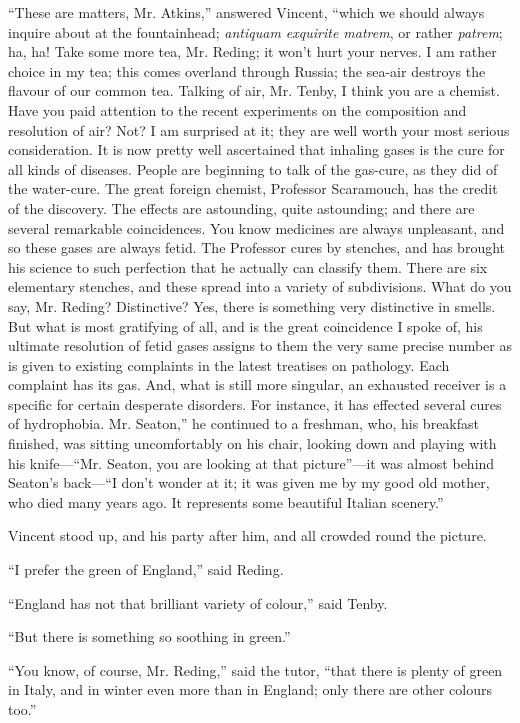 ``These are matters, Mr. Atkins,'' answered Vincent,
``which we should always inquire about at the fountainhead; \emph{antiquam
exquirite matrem}, or rather \emph{patrem}; ha, ha! Take some more
tea, Mr. Reding; it won't hurt your nerves. I am rather choice in my
tea; this comes overland through Russia; the sea-air destroys the
flavour of our common tea. Talking of air, Mr. Tenby, I think you are
a chemist. Have you paid attention to the recent experiments on the
composition and resolution of air? Not? I am surprised at it; they are
well worth your most serious consideration. It is now pretty well
ascertained that inhaling gases is the cure for all kinds of diseases.
People are beginning to talk of the gas-cure, as they did of the
water-cure. The great foreign chemist, Professor Scaramouch, has the
credit of the discovery. The effects are astounding, quite astounding;
and there are several remarkable coincidences. You know medicines are
always unpleasant, and so these gases are always fetid. The Professor
cures by stenches, and has brought his science to such perfection that
he actually can classify them. There are six elementary stenches, and
these spread into a variety of subdivisions. What do you say, Mr.
Reding? Distinctive? Yes, there is something very distinctive in
smells. But what is most gratifying of all, and is the great
coincidence I spoke of, his ultimate resolution of fetid gases assigns
to them the very same precise number as is given to existing
complaints in the latest treatises on pathology. Each complaint has
its gas. And, what is still more singular, an exhausted receiver
is a specific for certain desperate disorders. For instance, it has
effected several cures of hydrophobia. Mr. Seaton,'' he continued
to a freshman, who, his breakfast finished, was sitting uncomfortably
on his chair, looking down and playing with his knife—``Mr.
Seaton, you are looking at that picture''—it was almost behind
Seaton's back—``I don't wonder at it; it was given me by my good
old mother, who died many years ago. It represents some beautiful
Italian scenery.''

Vincent stood up, and his party after him, and all crowded round
the picture.

``I prefer the green of England,'' said Reding.

``England has not that brilliant variety of colour,'' said
Tenby.

``But there is something so soothing in green.''

``You know, of course, Mr. Reding,'' said the tutor,
``that there is plenty of green in Italy, and in winter even more
than in England; only there are other colours too.''

